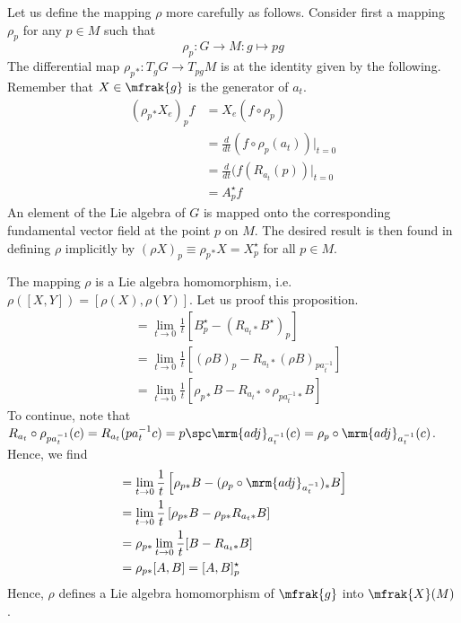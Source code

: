 \documentclass[10pt,reqno]{amsart}
\numberwithin{equation}{section}
\begin{document}
Let us define the mapping $\rho$ more carefully as follows.  
Consider first a mapping $\rho_p$ for any $p \in M$ such that
%
\begin{equation}
		\rho_p : G \rightarrow M : g \mapsto pg
\end{equation}
%
The differential map $\rho_p{}_\ast : T_g G \rightarrow T_{pg} M$ 
is at the identity given by the following. Remember that $X \in 
\mfrak{g}$ is the generator of $a_t$.
%
\begin{displaymath}
	\begin{split}
		(\rho_p{}_\ast X_e)_p f &= X_e (f \circ \rho_p) \\
		&= \frac{d}{dt}(f \circ \rho_p(a_t))|_{t=0} \\
		&= \frac{d}{dt}(f(R_{a_t}(p))|_{t=0} \\
		&= A_p^\star f
	\end{split}
\end{displaymath}
%
An element of the Lie algebra of $G$ is mapped onto the 
corresponding fundamental vector field at the point $p$ on $M$.  
The desired result is then found in defining $\rho$ implicitly by 
$(\rho X)_p \equiv \rho_p{}_\ast X = X_p^\star$ for all $p \in 
M$.

The mapping $\rho$ is a Lie algebra homomorphism, i.e.\ 
$\rho([X,Y]) = [\rho(X),\rho(Y)]$. Let us proof this proposition.
%
\begin{align*}
	[A^\star_p,B^\star_p] &= \lim_{t\rightarrow 0} \frac{1}{t} 
	\left[B_p^\star - (R_{a_t\ast} B^\star)_p \right] \\
		&= \lim_{t\rightarrow 0}\frac{1}{t} \left[(\rho B)_p - 
			R_{a_t\ast} (\rho B)_{pa_t^{-1}} \right] \\
		&= \lim_{t\rightarrow 0}\frac{1}{t} \left[\rho_{p\ast} B - 
			R_{a_t\ast}\circ \rho_{pa_t^{-1}\ast}B \right]
\end{align*}
%
To continue, note that $R_{a_t} \circ \rho_{pa_t^{-1}}(c) = 
R_{a_t}(p a_t^{-1}c) = p\spc \mrm{adj}_{a_t^{-1}}(c) = \rho_p 
\circ \mrm{adj}_{a_t^{-1}} (c)$.  Hence, we find
%
\begin{align*}
	[A^\star_p,B^\star_p] &= \lim_{t\rightarrow 0}\frac{1}{t} 
	\left[\rho_{p\ast}B - (\rho_p \circ \mrm{adj}_{a_t^{-1}})_\ast 
		B \right]\\
		&= \lim_{t\rightarrow 0}\frac{1}{t} \left[ \rho_{p\ast}B - 
			\rho_{p\ast} R_{a_t\ast} B \right] \\
		&= \rho_{p\ast} \lim_{t\rightarrow 0}\frac{1}{t} [B - 
		R_{a_t\ast}B] \\
		&= \rho_{p\ast}[A,B] = [A,B]^\star_p
\end{align*}
%
Hence, $\rho$ defines a Lie algebra homomorphism of $\mfrak{g}$ 
into $\mfrak{X}(M)$.
\end{document}
